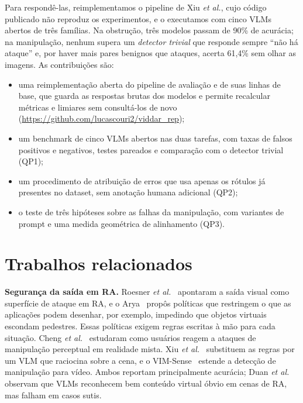 \documentclass[conference]{IEEEtran}
\begin{document}
Para respondê-las, reimplementamos o pipeline de Xiu \emph{et al.}, cujo código publicado não
reproduz os experimentos, e o executamos com cinco VLMs abertos de três famílias. Na obstrução, três modelos passam de 90\% de acurácia; na
manipulação, nenhum supera um \emph{detector trivial} que responde sempre ``não há ataque'' e, por haver
mais pares benignos que ataques, acerta 61,4\% sem olhar as imagens. As contribuições são:
\begin{itemize}
\item uma reimplementação aberta do pipeline de avaliação e de suas linhas de base, que guarda as
  respostas brutas dos modelos e permite recalcular métricas e limiares sem consultá-los de novo
  (\url{https://github.com/lucascouri2/viddar_rep});
\item um benchmark de cinco VLMs abertos nas duas tarefas, com taxas de falsos positivos e negativos,
  testes pareados e comparação com o detector trivial (QP1);
\item um procedimento de atribuição de erros que usa apenas os rótulos já presentes no dataset, sem
  anotação humana adicional (QP2);
\item o teste de três hipóteses sobre as falhas da manipulação, com variantes de prompt e uma medida
  geométrica de alinhamento (QP3).
\end{itemize}

\section{Trabalhos relacionados}
\label{sec:rel}

\textbf{Segurança da saída em RA.} Roesner \emph{et al.}~\cite{roesner2014} apontaram a saída visual
como superfície de ataque em RA, e o Arya~\cite{arya} propôs políticas que restringem o que as aplicações
podem desenhar, por exemplo, impedindo que objetos virtuais escondam pedestres. Essas políticas exigem
regras escritas à mão para cada situação. Cheng \emph{et al.}~\cite{cheng2023} estudaram como usuários
reagem a ataques de manipulação perceptual em realidade mista. Xiu \emph{et al.}~\cite{viddar}
substituem as regras por um VLM que raciocina sobre a cena, e o VIM-Sense~\cite{vimsense} estende a
detecção de manipulação para vídeo. Ambos reportam principalmente acurácia; Duan \emph{et al.}~\cite{duan2025} observam que VLMs reconhecem bem conteúdo
virtual óbvio em cenas de RA, mas falham em casos sutis.
\end{document}
